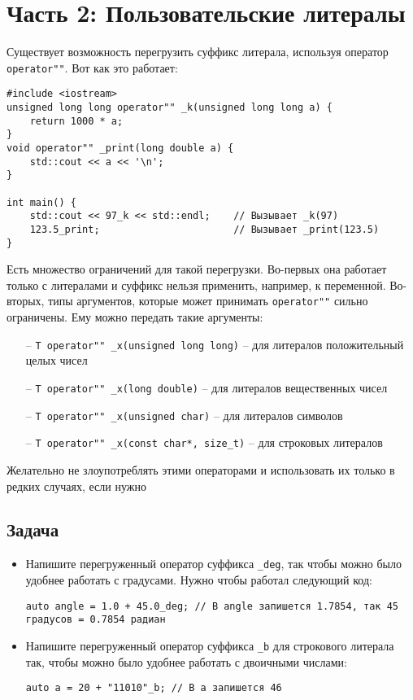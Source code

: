 \documentclass{article}
\begin{document}
\section*{Часть 2: Пользовательские литералы}
Существует возможность перегрузить суффикс литерала, используя оператор \texttt{operator"{}"}. Вот как это работает:
\begin{lstlisting}
#include <iostream>
unsigned long long operator"" _k(unsigned long long a) {
    return 1000 * a;
}
void operator"" _print(long double a) {
    std::cout << a << '\n';
}

int main() {
    std::cout << 97_k << std::endl;    // Вызывает _k(97)
    123.5_print;                       // Вызывает _print(123.5)
}
\end{lstlisting}
Есть множество ограничений для такой перегрузки. Во-первых она работает только с литералами и суффикс нельзя применить, например, к переменной. Во-вторых, типы аргументов, которые может принимать \texttt{operator"{}"} сильно ограничены. Ему можно передать такие аргументы:
\begin{itemize}
\item[--] \texttt{T operator"" \_x(unsigned long long)} -- для литералов положительный целых чисел
\item[--] \texttt{T operator"" \_x(long double)} -- для литералов вещественных чисел
\item[--] \texttt{T operator"" \_x(unsigned char)} -- для литералов символов
\item[--] \texttt{T operator"" \_x(const char*, size\_t)} -- для строковых литералов
\end{itemize}
Желательно не злоупотреблять этими операторами и использовать их только в редких случаях, если нужно 

\subsection*{Задача}
\begin{itemize}
\item Напишите перегруженный оператор суффикса \texttt{\_deg}, так чтобы можно было удобнее работать с градусами. Нужно чтобы работал следующий код:
\begin{lstlisting}
auto angle = 1.0 + 45.0_deg; // В angle запишется 1.7854, так 45 градусов = 0.7854 радиан
\end{lstlisting}
\item Напишите перегруженный оператор суффикса \texttt{\_b} для строкового литерала так, чтобы можно было удобнее работать с двоичными числами:
\begin{lstlisting}
auto a = 20 + "11010"_b; // В a запишется 46
\end{lstlisting}
\end{itemize}
\end{document}
